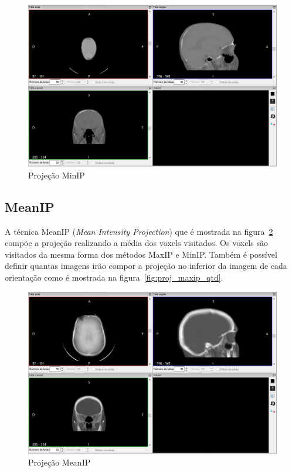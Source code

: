 \begin{figure}[H]
\centering
\includegraphics[scale=0.40]{../user_guide_figures/invesalius_screen/multiplanar_window_minip_pt.png}
\caption{Projeção MinIP}
\label{fig:proj_minIP}
\end{figure}

\subsection{MeanIP}
A técnica MeanIP (\textit{Mean Intensity Projection}) que é mostrada na figura~\ref{fig:proj_meanIP} compõe a projeção realizando a média dos voxels visitados. Os voxels são visitados da mesma forma dos métodos MaxIP e MinIP. Também é possível definir quantas imagens irão compor a projeção no inferior da imagem de cada orientação como é mostrada na figura~\ref{fig:proj_maxip_qtd}.

\begin{figure}[H]
\centering
\includegraphics[scale=0.40]{../user_guide_figures/invesalius_screen/multiplanar_window_mean_pt.png}
\caption{Projeção MeanIP}
\label{fig:proj_meanIP}
\end{figure}

